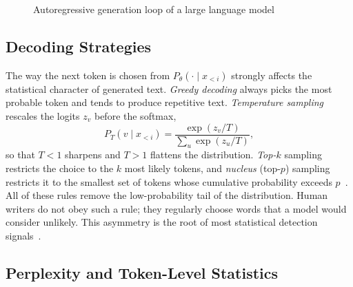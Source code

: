 \begin{figure}[H]
\centering
{}
\caption{Autoregressive generation loop of a large language model}
\label{fig:autoregressive}
\end{figure}

\subsection{Decoding Strategies}

The way the next token is chosen from $P_\theta(\cdot \mid x_{<i})$ strongly
affects the statistical character of generated text. \emph{Greedy decoding}
always picks the most probable token and tends to produce repetitive text.
\emph{Temperature sampling} rescales the logits $z_v$ before the softmax,
\begin{equation}
  P_T(v \mid x_{<i}) = \frac{\exp(z_v/T)}{\sum_{u}\exp(z_u/T)},
  \label{eq:temperature}
\end{equation}
so that $T<1$ sharpens and $T>1$ flattens the distribution. \emph{Top-$k$}
sampling restricts the choice to the $k$ most likely tokens, and \emph{nucleus}
(top-$p$) sampling restricts it to the smallest set of tokens whose cumulative
probability exceeds $p$~\cite{holtzman2020curious}. All of these rules remove
the low-probability tail of the distribution. Human writers do not obey such a
rule; they regularly choose words that a model would consider unlikely. This
asymmetry is the root of most statistical detection signals~\cite{gehrmann2019gltr,
ippolito2020automatic}.

\subsection{Perplexity and Token-Level Statistics}

